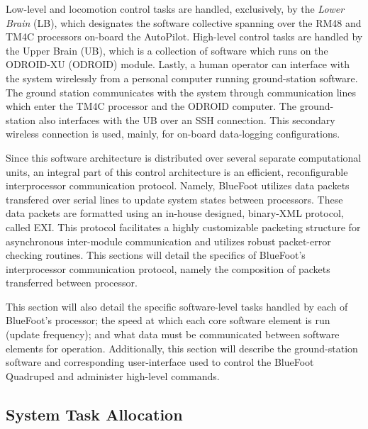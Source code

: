 	Low-level and locomotion control tasks are handled, exclusively, by the \emph{Lower Brain} (LB), which designates the software collective spanning over the RM48 and TM4C processors on-board the AutoPilot. High-level control tasks are handled by the Upper Brain (UB), which is a collection of software which runs on the ODROID-XU (ODROID) module. Lastly, a human operator can interface with the system wirelessly from a personal computer running ground-station software. The ground station  communicates with the system through communication lines which enter the TM4C processor and the ODROID computer. The ground-station also interfaces with the UB over an SSH connection. This secondary wireless connection is used, mainly, for on-board data-logging configurations.

	Since this software architecture is distributed over several separate computational units, an integral part of this control architecture is an efficient, reconfigurable interprocessor communication protocol. Namely, BlueFoot utilizes data packets transfered over serial lines to update system states between processors. These data packets are formatted using an in-house designed, binary-XML protocol, called EXI. This protocol facilitates a highly customizable packeting structure for asynchronous inter-module communication and utilizes robust packet-error checking routines. This sections will detail the specifics of BlueFoot's interprocessor communication protocol, namely the composition of packets transferred between processor. 

	This section will also detail the specific software-level tasks handled by each of BlueFoot's processor; the speed at which each core software element is run (update frequency); and what data must be communicated between software elements for operation. Additionally, this section will describe the ground-station software and corresponding user-interface used to control the BlueFoot Quadruped and administer high-level commands.
	
	\subsection{System Task Allocation}

